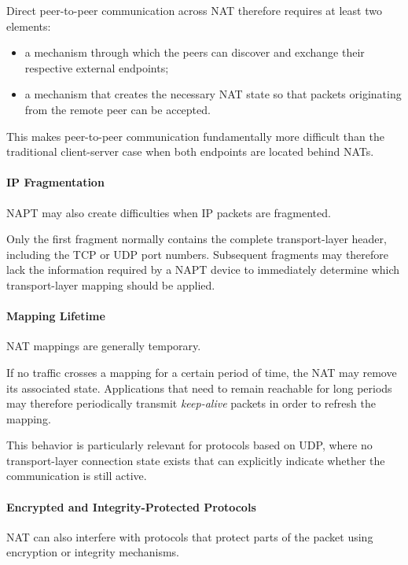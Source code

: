 Direct peer-to-peer communication across NAT therefore requires at least two elements:

\begin{itemize}
	\item a mechanism through which the peers can discover and exchange their respective external endpoints;
	\item a mechanism that creates the necessary NAT state so that packets originating from the remote peer can be accepted.
\end{itemize}

This makes peer-to-peer communication fundamentally more difficult than the traditional client-server case when both endpoints are located behind NATs.

\paragraph{IP Fragmentation}

NAPT may also create difficulties when IP packets are fragmented.

Only the first fragment normally contains the complete transport-layer header, including the TCP or UDP port numbers. Subsequent fragments may therefore lack the information required by a NAPT device to immediately determine which transport-layer mapping should be applied.

\paragraph{Mapping Lifetime}

NAT mappings are generally temporary.

If no traffic crosses a mapping for a certain period of time, the NAT may remove its associated state. Applications that need to remain reachable for long periods may therefore periodically transmit \textit{keep-alive} packets in order to refresh the mapping.

This behavior is particularly relevant for protocols based on UDP, where no transport-layer connection state exists that can explicitly indicate whether the communication is still active.

\paragraph{Encrypted and Integrity-Protected Protocols}

NAT can also interfere with protocols that protect parts of the packet using encryption or integrity mechanisms.

